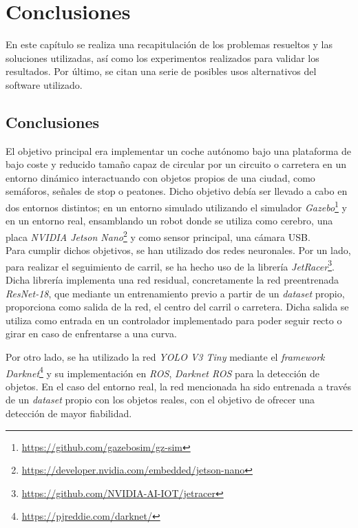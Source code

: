\chapter{Conclusiones}
\label{cap:capitulo5}
En este capítulo se realiza una recapitulación de los problemas resueltos y las soluciones utilizadas, así como los experimentos realizados para validar los resultados. Por último, se citan una serie de posibles usos alternativos del software utilizado.\\

\section{Conclusiones}
\label{section:conclusiones}
El objetivo principal era implementar un coche autónomo bajo una plataforma de bajo coste y reducido tamaño capaz de circular por un circuito o carretera en un entorno dinámico interactuando con objetos propios de una ciudad, como semáforos, señales de stop o peatones. Dicho objetivo debía ser llevado a cabo en dos entornos distintos; en un entorno simulado utilizando el simulador \textit{Gazebo}\footnote{\url{https://github.com/gazebosim/gz-sim}} y en un entorno real, ensamblando un robot donde se utiliza como cerebro, una placa \textit{NVIDIA Jetson Nano}\footnote{\url{https://developer.nvidia.com/embedded/jetson-nano}} y como sensor principal, una cámara USB.\\

Para cumplir dichos objetivos, se han utilizado dos redes neuronales. Por un lado, para realizar el seguimiento de carril, se ha hecho uso de la librería \textit{JetRacer}\footnote{\url{https://github.com/NVIDIA-AI-IOT/jetracer}}. Dicha librería implementa una red residual, concretamente la red preentrenada \textit{ResNet-18}, que mediante un entrenamiento previo a partir de un \textit{dataset} propio, proporciona como salida de la red, el centro del carril o carretera. Dicha salida se utiliza como entrada en un controlador implementado para poder seguir recto o girar en caso de enfrentarse a una curva.

Por otro lado, se ha utilizado la red \textit{YOLO V3 Tiny} mediante el \textit{framework} \textit{Darknet}\footnote{\url{https://pjreddie.com/darknet/}} y su implementación en \textit{ROS}, \textit{Darknet ROS} para la detección de objetos. En el caso del entorno real, la red mencionada ha sido entrenada a través de un \textit{dataset} propio con los objetos reales, con el objetivo de ofrecer una detección de mayor fiabilidad. 

